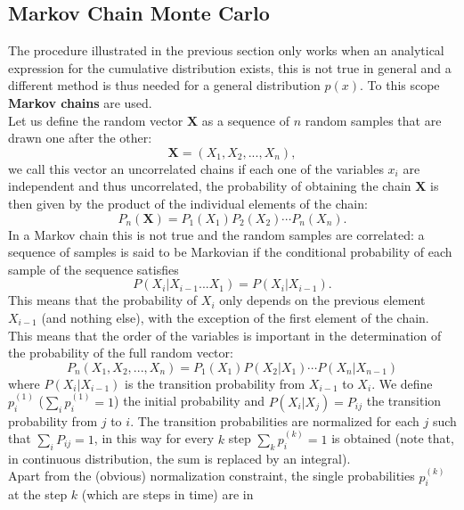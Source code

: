 \subsection{Markov Chain Monte Carlo}
The procedure illustrated in the previous section only works when an analytical expression for the cumulative distribution exists, 
this is not true in general and a different method is thus needed for a general distribution $p(x)$. To this scope \textbf{Markov chains} are 
used.\\
Let us define the random vector $\mathbf{X}$ as a sequence of $n$ random samples that are drawn one after the other:
\begin{equation}
    \mathbf{X}=\left(X_1,X_2,...,X_n\right),
\end{equation}
we call this vector an uncorrelated chains if each one of the variables $x_i$ are independent and thus uncorrelated, the probability of 
obtaining the chain $\mathbf{X}$ is then given by the product of the individual elements of the chain:
\begin{equation}
    P_n(\mathbf{X})=P_1(X_1)P_2(X_2)\cdots P_n(X_n).
\end{equation}
In a Markov chain this is not true and the random samples are correlated: a sequence of samples is said to be Markovian if the conditional 
probability of each sample of the sequence satisfies
\begin{equation}
    P(X_i|X_{i-1}...X_1)=P(X_i|X_{i-1}).
\end{equation}
This means that the probability of $X_i$ only depends on the previous element $X_{i-1}$ (and nothing else), with the exception of the first 
element of the chain. This means that the order of the variables is important in the determination of the probability 
of the full random vector:
\begin{equation}
    P_n(X_1,X_2,...,X_n)=P_1(X_1)P(X_2|X_1)\cdots P(X_n|X_{n-1})
\end{equation}
where $P(X_i|X_{i-1})$ is the transition probability from $X_{i-1}$ to $X_i$.
We define $p_i^{(1)}$ ($\sum_i p_i^{(1)}=1$) the initial probability and $P(X_i|X_j)=P_{ij}$ the transition probability from $j$ to $i$. The transition 
probabilities are normalized for each $j$ such that $\sum_i P_{ij}=1$, in this way for every $k$ step $\sum_k p_i^{(k)}=1$ is obtained (note that, in continuous 
distribution, the sum is replaced by an integral).\\
Apart from the (obvious) normalization constraint, the single probabilities $p_i^{(k)}$ at the step $k$ (which are steps in time) are in 
